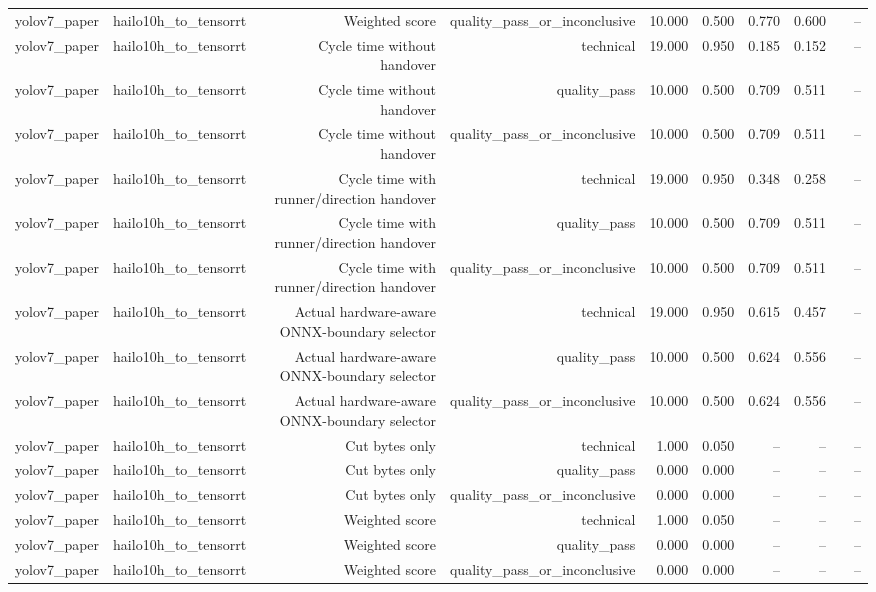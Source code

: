 \begin{table}[t]
\begin{tabular}{lrrrrrrrrr}
yolov7\_paper & hailo10h\_to\_tensorrt & Weighted score & quality\_pass\_or\_inconclusive & 10.000 & 0.500 & 0.770 & 0.600 &  & -- \\
yolov7\_paper & hailo10h\_to\_tensorrt & Cycle time without handover & technical & 19.000 & 0.950 & 0.185 & 0.152 &  & -- \\
yolov7\_paper & hailo10h\_to\_tensorrt & Cycle time without handover & quality\_pass & 10.000 & 0.500 & 0.709 & 0.511 &  & -- \\
yolov7\_paper & hailo10h\_to\_tensorrt & Cycle time without handover & quality\_pass\_or\_inconclusive & 10.000 & 0.500 & 0.709 & 0.511 &  & -- \\
yolov7\_paper & hailo10h\_to\_tensorrt & Cycle time with runner/direction handover & technical & 19.000 & 0.950 & 0.348 & 0.258 &  & -- \\
yolov7\_paper & hailo10h\_to\_tensorrt & Cycle time with runner/direction handover & quality\_pass & 10.000 & 0.500 & 0.709 & 0.511 &  & -- \\
yolov7\_paper & hailo10h\_to\_tensorrt & Cycle time with runner/direction handover & quality\_pass\_or\_inconclusive & 10.000 & 0.500 & 0.709 & 0.511 &  & -- \\
yolov7\_paper & hailo10h\_to\_tensorrt & Actual hardware-aware ONNX-boundary selector & technical & 19.000 & 0.950 & 0.615 & 0.457 &  & -- \\
yolov7\_paper & hailo10h\_to\_tensorrt & Actual hardware-aware ONNX-boundary selector & quality\_pass & 10.000 & 0.500 & 0.624 & 0.556 &  & -- \\
yolov7\_paper & hailo10h\_to\_tensorrt & Actual hardware-aware ONNX-boundary selector & quality\_pass\_or\_inconclusive & 10.000 & 0.500 & 0.624 & 0.556 &  & -- \\
yolov7\_paper & hailo10h\_to\_tensorrt & Cut bytes only & technical & 1.000 & 0.050 & -- & -- &  & -- \\
yolov7\_paper & hailo10h\_to\_tensorrt & Cut bytes only & quality\_pass & 0.000 & 0.000 & -- & -- &  & -- \\
yolov7\_paper & hailo10h\_to\_tensorrt & Cut bytes only & quality\_pass\_or\_inconclusive & 0.000 & 0.000 & -- & -- &  & -- \\
yolov7\_paper & hailo10h\_to\_tensorrt & Weighted score & technical & 1.000 & 0.050 & -- & -- &  & -- \\
yolov7\_paper & hailo10h\_to\_tensorrt & Weighted score & quality\_pass & 0.000 & 0.000 & -- & -- &  & -- \\
yolov7\_paper & hailo10h\_to\_tensorrt & Weighted score & quality\_pass\_or\_inconclusive & 0.000 & 0.000 & -- & -- &  & -- \\

\end{tabular}
\end{table}
